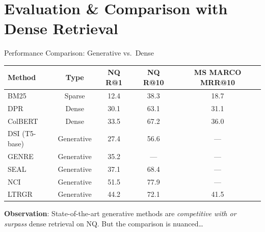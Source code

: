 \documentclass[aspectratio=169,11pt]{beamer}
\begin{document}
\section{Evaluation \& Comparison with Dense Retrieval}

\begin{frame}{Performance Comparison: Generative vs.\ Dense}
\begin{center}
\begin{tabular}{lcccc}
\toprule
\textbf{Method} & \textbf{Type} & \textbf{NQ R@1} & \textbf{NQ R@10} & \textbf{MS MARCO MRR@10} \\
\midrule
BM25 & Sparse & 12.4 & 38.3 & 18.7 \\
DPR & Dense & 30.1 & 63.1 & 31.1 \\
ColBERT & Dense & 33.5 & 67.2 & 36.0 \\
\midrule
DSI (T5-base) & Generative & 27.4 & 56.6 & --- \\
GENRE & Generative & 35.2 & --- & --- \\
SEAL & Generative & 37.1 & 68.4 & --- \\
NCI & Generative & 51.5 & 77.9 & --- \\
LTRGR & Generative & 44.2 & 72.1 & 41.5 \\
\bottomrule
\end{tabular}
\end{center}

\vspace{0.3cm}
\textbf{Observation}: State-of-the-art generative methods are \emph{competitive with or surpass} dense retrieval on NQ. But the comparison is nuanced\ldots
\end{frame}

\end{document}
